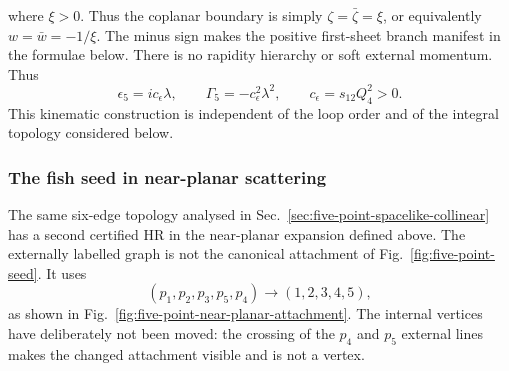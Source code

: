 \documentclass[a4paper,11pt]{article}
\begin{document}
where \(\xi>0\).  Thus the coplanar boundary is simply
\(\zeta=\bar\zeta=\xi\), or equivalently
\(w=\bar w=-1/\xi\).  The minus sign makes the positive first-sheet branch
manifest in the formulae below.
There is no rapidity hierarchy or soft external momentum.  Thus
\begin{equation}
 \epsilon_5=i c_\epsilon\lambda,\qquad
 \Gamma_5=-c_\epsilon^2\lambda^2,\qquad
 c_\epsilon=s_{12}Q_4^2>0.
 \label{eq:five-near-planar-limit}
\end{equation}
This kinematic construction is independent of the loop order and of the
integral topology considered below.

\subsubsection{The fish seed in near-planar scattering}
\label{sec:five-point-near-planar-seed}

The same six-edge topology analysed in
Sec.~\ref{sec:five-point-spacelike-collinear} has a second certified HR in the
near-planar expansion defined above.  The externally labelled graph is not the canonical
attachment of Fig.~\ref{fig:five-point-seed}.  It uses
\begin{equation}
 (p_1,p_2,p_3,p_5,p_4)\longrightarrow(1,2,3,4,5),
 \label{eq:five-near-planar-attachment}
\end{equation}
as shown in Fig.~\ref{fig:five-point-near-planar-attachment}.  The internal
vertices have deliberately not been moved: the crossing of the \(p_4\) and
\(p_5\) external lines makes the changed attachment visible and is not a
vertex.
\end{document}
